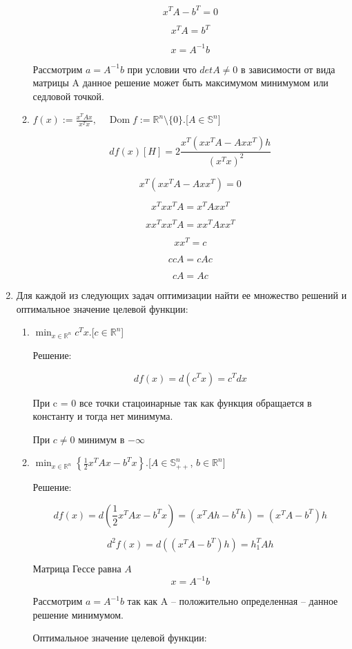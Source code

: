 \documentclass{article}
\newcommand{\R}{\mathbb{R}}
\renewcommand{\S}{\mathbb{S}}
\DeclareMathOperator*{\Dom}{Dom}
\begin{document}
\begin{enumerate}[label=\textbf{\arabic*}, leftmargin=0em]
\begin{enumerate}
$$
x^TA - b^T = 0
$$

$$
x^TA = b^T
$$

$$
x = A^{-1}b
$$

Рассмотрим  $a = A^{-1}b$ при условии что $detA \neq 0$ в зависимости от вида матрицы A данное решение может быть максимумом минимумом или седловой точкой.


\item $\displaystyle f(x) := \frac{x^T A x}{x^T x}, \quad \Dom f := \R^n \setminus \{0\}$.\hfill[$A \in \S^n$]

$$
df(x)[H] = 2\frac{x^T(x x^TA - A x x^T)h}{(x^T x)^2}
$$

$$
x^T(x x^TA - A x x^T) = 0
$$

$$
x^T x x^T A = x^T A x x^T
$$


$$
x x^T x x^T A = xx^T A x x^T
$$

$$
xx^T = c
$$

$$
ccA = cAc
$$

$$
cA = Ac
$$


\end{enumerate}

\item Для каждой из следующих задач оптимизации найти ее множество решений и оптимальное значение целевой функции:
\begin{enumerate}
\item $\displaystyle\min_{x \in \R^n} c^T x$.\hfill[$c \in \R^n$]

Решение:

$$
d f(x) = d(c^Tx) = c^Tdx
$$

При c = 0  все точки стацоинарные так как функция обращается в константу и тогда нет минимума.

При $c \neq 0$ минимум в $-\infty$

\item $\displaystyle\min_{x \in \R^n} \left\{ \frac{1}{2} x^T A x - b^T x \right\}$.\hfill[$A \in \S^n_{++}$, $b \in \R^n$]

Решение:

$$
df(x) =  d(\frac{1}{2} x^T A x - b^T x) = (x^TAh - b^Th) = (x^TA - b^T)h
$$

$$
d^2 f(x) = d((x^TA - b^T)h) = h_1^TAh
$$

Матрица Гессе равна $A$
$$
x = A^{-1}b
$$

Рассмотрим  $a = A^{-1}b$  так как A -- положительно определенная -- данное решение минимумом.

Оптимальное значение целевой функции:


\end{enumerate}
\end{enumerate}
\end{document}
